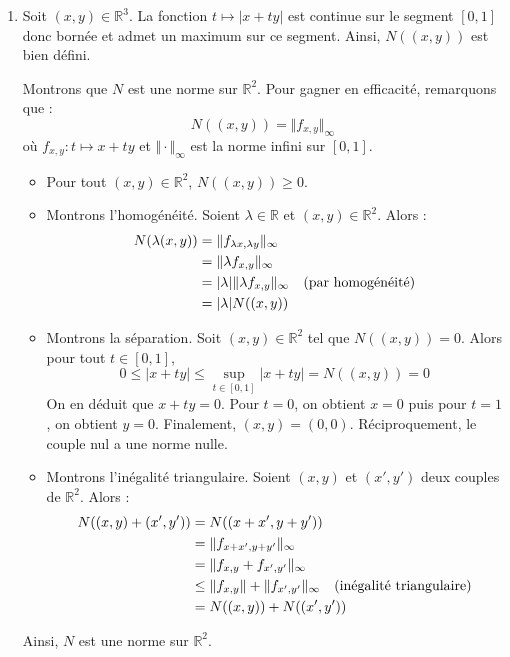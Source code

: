 \documentclass[a4paper,10pt]{report}
\begin{document}
\begin{enumerate}
\item Soit $(x,y) \in \mathbb{R}^3$. La fonction $t \mapsto \vert x+ty \vert$ est continue sur le segment $[0,1]$ donc bornée et admet un maximum sur ce segment. Ainsi, $N((x,y))$ est bien défini.

\medskip

\noindent Montrons que $N$ est une norme sur $\mathbb{R}^2$. Pour gagner en efficacité, remarquons que :
$$ N((x,y)) = \Vert f_{x,y} \Vert_{\infty}$$
où $f_{x,y} : t \mapsto x+ty$ et $\Vert \cdot \Vert_{\infty}$ est la norme infini sur $[0,1]$.

\begin{itemize}
\item Pour tout $(x,y) \in \mathbb{R}^2$, $N((x,y)) \geq 0$.
\item Montrons l'homogénéité. Soient $\lambda \in \mathbb{R}$ et $(x,y) \in \mathbb{R}^2$. Alors :
\begin{align*}
N(\lambda (x,y)) & = \Vert f_{\lambda x, \lambda y} \Vert_{\infty} \\
& = \Vert \lambda f_{x,y} \Vert_{\infty} \\
& = \vert \lambda \vert \Vert \lambda f_{x,y} \Vert_{\infty} \quad \hbox{(par homogénéité)} \\
& = \vert \lambda \vert N((x,y)) 
\end{align*}
\item Montrons la séparation. Soit $(x,y) \in \mathbb{R}^2$ tel que $N((x,y))=0$. Alors pour tout $t \in [0,1]$,
$$ 0 \leq \vert x+ty \vert \leq \sup_{t \in [0,1]} \vert x+ty \vert = N((x,y))=0 $$
On en déduit que $x+ty=0$. Pour $t=0$, on obtient $x=0$ puis pour $t=1$, on obtient $y=0$. Finalement, $(x,y)=(0,0)$. Réciproquement, le couple nul a une norme nulle.
\item Montrons l'inégalité triangulaire. Soient $(x,y)$ et $(x',y')$ deux couples de $\mathbb{R}^2$. Alors :
\begin{align*}
N((x,y)+(x',y')) & = N((x+x',y+y')) \\
& = \Vert f_{x+x',y+y'} \Vert_{\infty} \\
& = \Vert f_{x,y} + f_{x',y'} \Vert_{\infty} \\
& \leq \Vert f_{x,y} \Vert + \Vert f_{x',y'} \Vert_{\infty} \quad \hbox{(inégalité triangulaire)} \\
& = N((x,y))+ N((x',y')) 
\end{align*}
\end{itemize}
Ainsi, $N$ est une norme sur $\mathbb{R}^2$.

\end{enumerate}
\end{document}
